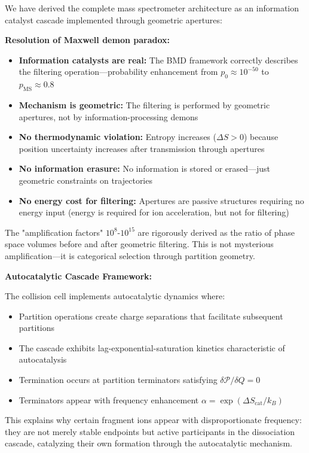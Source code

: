 We have derived the complete mass spectrometer architecture as an information catalyst cascade implemented through geometric apertures:

\textbf{Resolution of Maxwell demon paradox:}
\begin{itemize}
    \item \textbf{Information catalysts are real:} The BMD framework correctly describes the filtering operation—probability enhancement from $p_0 \approx 10^{-50}$ to $p_{\text{MS}} \approx 0.8$
    \item \textbf{Mechanism is geometric:} The filtering is performed by geometric apertures, not by information-processing demons
    \item \textbf{No thermodynamic violation:} Entropy increases ($\Delta S > 0$) because position uncertainty increases after transmission through apertures
    \item \textbf{No information erasure:} No information is stored or erased—just geometric constraints on trajectories
    \item \textbf{No energy cost for filtering:} Apertures are passive structures requiring no energy input (energy is required for ion acceleration, but not for filtering)
\end{itemize}

The "amplification factors" $10^8$-$10^{15}$ are rigorously derived as the ratio of phase space volumes before and after geometric filtering. This is not mysterious amplification—it is categorical selection through partition geometry.

\textbf{Autocatalytic Cascade Framework:}

The collision cell implements autocatalytic dynamics where:
\begin{itemize}
    \item Partition operations create charge separations that facilitate subsequent partitions
    \item The cascade exhibits lag-exponential-saturation kinetics characteristic of autocatalysis
    \item Termination occurs at partition terminators satisfying $\delta \mathcal{P} / \delta Q = 0$
    \item Terminators appear with frequency enhancement $\alpha = \exp(\Delta S_{\text{cat}}/k_B)$
\end{itemize}

This explains why certain fragment ions appear with disproportionate frequency: they are not merely stable endpoints but active participants in the dissociation cascade, catalyzing their own formation through the autocatalytic mechanism.


